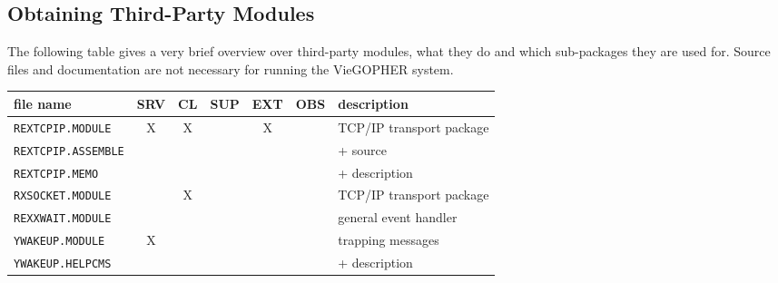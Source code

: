 \begin{appendix}
\subsection{Obtaining Third-Party Modules}

The following table gives a very brief overview over third-party modules,
what they do and which sub-packages they are used for.  Source files and
documentation are not necessary for running the VieGOPHER system.\\
\rule{0mm}{2mm}

\noindent\begin{footnotesize}
\begin{tabular}{|l||c|c|c|c|c||l|} \hline
file name               &SRV&CL&SUP&EXT&OBS&description                     \\
\hline\hline
{\tt REXTCPIP.MODULE  } & X &X &   & X &   &TCP/IP transport package        \\
{\tt REXTCPIP.ASSEMBLE} &   &  &   &   &   &+ source                        \\
{\tt REXTCPIP.MEMO    } &   &  &   &   &   &+ description                   \\
\hline
{\tt RXSOCKET.MODULE  } &   &X &   &   &   &TCP/IP transport package        \\
{\tt REXXWAIT.MODULE  } &   &  &   &   &   &general event handler           \\
\hline
{\tt YWAKEUP.MODULE   } & X &  &   &   &   &trapping messages               \\
{\tt YWAKEUP.HELPCMS  } &   &  &   &   &   &+ description                   \\
\hline
\end{tabular}

\end{footnotesize}
\end{appendix}
